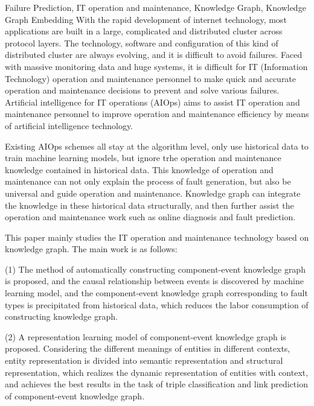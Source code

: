         

\begin{englishabstract}{Failure Prediction, IT operation and maintenance, Knowledge Graph, Knowledge Graph Embedding}
With the rapid development of internet technology, most applications are built in a large, complicated and distributed cluster across protocol layers. The technology, software and configuration of this kind of distributed cluster are always evolving, and it is difficult to avoid failures. Faced with massive monitoring data and huge systems, it is difficult for IT (Information Technology) operation and maintenance personnel to make quick and accurate operation and maintenance decisions to prevent and solve various failures. Artificial intelligence for IT operations (AIOps) aims to assist IT operation and maintenance personnel to improve operation and maintenance efficiency by means of artificial intelligence technology. 

Existing AIOps schemes all stay at the algorithm level, only use historical data to train machine learning models, but ignore trhe operation and maintenance knowledge contained in historical data. This knowledge of operation and maintenance can not only explain the process of fault generation, but also be universal and guide operation and maintenance. Knowledge graph can integrate the knowledge in these historical data structurally, and then further assist the operation and maintenance work such as online diagnosis and fault prediction. 

This paper mainly studies the IT operation and maintenance technology based on knowledge graph. The main work is as follows: 

(1) The method of automatically constructing component-event knowledge graph is proposed, and the causal relationship between events is discovered by machine learning model, and the component-event knowledge graph corresponding to fault types is precipitated from historical data, which reduces the labor consumption of constructing knowledge graph. 

(2) A representation learning model of component-event knowledge graph is proposed. Considering the different meanings of entities in different contexts, entity representation is divided into semantic representation and structural representation, which realizes the dynamic representation of entities with context, and achieves the best results in the task of triple classification and link prediction of component-event knowledge graph.


\end{englishabstract}
